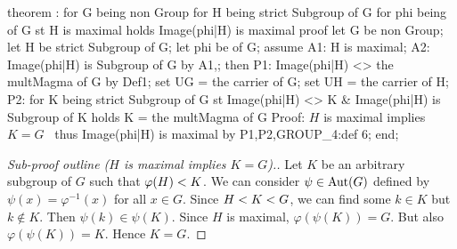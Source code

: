 \nwenddocs{}\endmoddef\nwstartdeflinemarkup{}\nwenddeflinemarkup
theorem :
  for G being non  Group
  for H being strict Subgroup of G
  for phi being  of G
  st H is maximal
  holds Image(phi|H) is maximal
proof
  let G be non  Group;
  let H be strict Subgroup of G;
  let phi be  of G;
  assume A1: H is maximal;
  A2: Image(phi|H) is  Subgroup of G by A1,;
  then P1: Image(phi|H) <> the multMagma of G by Def1;
  set UG = the carrier of G;
  set UH = the carrier of H;
  P2: for K being strict Subgroup of G
  st Image(phi|H) <> K & Image(phi|H) is Subgroup of K
  holds K = the multMagma of G
  \LA{}Proof: $H$ is maximal implies $K=G$~{\nwtagstyle{}}\RA{}
  thus Image(phi|H) is maximal by P1,P2,GROUP_4:def 6;
end;
\eatline
{}\nwendcode{}\nwdocspar
\begin{proof}[Sub-proof outline ($H$ is maximal implies $K=G$).]
Let $K$ be an arbitrary subgroup of $G$ such that $\varphi(H)< K$.
We can consider $\psi\in\operatorname{Aut}(G)$ defined by $\psi(x)=\varphi^{-1}(x)$
for all $x\in G$. Since $H< K< G$, we can
find some $k\in K$ but $k\notin K$. Then $\psi(k)\in\psi(K)$. Since $H$
is maximal, $\varphi(\psi(K))=G$. But also $\varphi(\psi(K))=K$. Hence $K=G$.
\end{proof}

